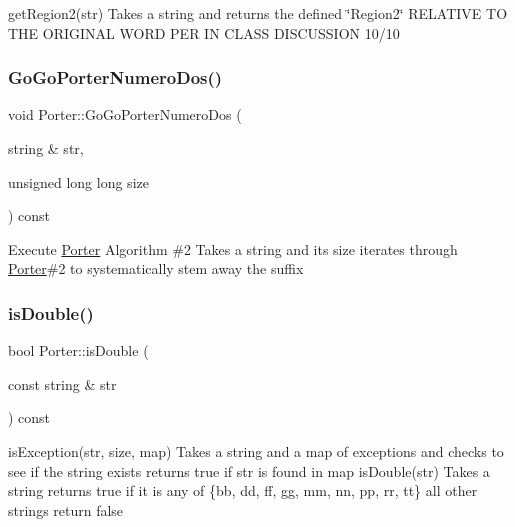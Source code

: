 get\+Region2(str) Takes a string and returns the defined \char`\"{}\+Region2\char`\"{} R\+E\+L\+A\+T\+I\+VE TO T\+HE O\+R\+I\+G\+I\+N\+AL W\+O\+RD P\+ER IN C\+L\+A\+SS D\+I\+S\+C\+U\+S\+S\+I\+ON 10/10 \mbox{\label{classPorter_af7f1d6892ca1ed4e22986c48be2365d6}} 
\subsubsection{\texorpdfstring{Go\+Go\+Porter\+Numero\+Dos()}{GoGoPorterNumeroDos()}}
{\footnotesize\ttfamily void Porter\+::\+Go\+Go\+Porter\+Numero\+Dos (\begin{DoxyParamCaption}\item[{string \&}]{str,  }\item[{unsigned long long}]{size }\end{DoxyParamCaption}) const}

Execute \hyperlink{classPorter}{Porter} Algorithm \#2 Takes a string and its size iterates through \hyperlink{classPorter}{Porter}\#2 to systematically stem away the suffix \mbox{\label{classPorter_a7c8a4b3b6103ce655e8ffc8a3eba1897}} 
\subsubsection{\texorpdfstring{is\+Double()}{isDouble()}}
{\footnotesize\ttfamily bool Porter\+::is\+Double (\begin{DoxyParamCaption}\item[{const string \&}]{str }\end{DoxyParamCaption}) const}

is\+Exception(str, size, map) Takes a string and a map of exceptions and checks to see if the string exists returns true if str is found in map is\+Double(str) Takes a string returns true if it is any of \{\textquotesingle{}bb\textquotesingle{}, \textquotesingle{}dd\textquotesingle{}, \textquotesingle{}ff\textquotesingle{}, \textquotesingle{}gg\textquotesingle{}, \textquotesingle{}mm\textquotesingle{}, \textquotesingle{}nn\textquotesingle{}, \textquotesingle{}pp\textquotesingle{}, \textquotesingle{}rr\textquotesingle{}, \textquotesingle{}tt\textquotesingle{}\} all other strings return false \mbox{\label{classPorter_a35b1cc5606d4e78d1f69ac4037fdde87}} 
